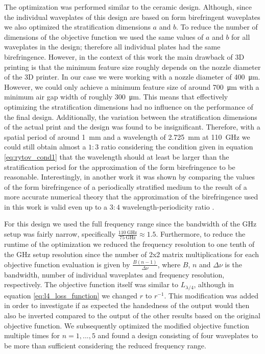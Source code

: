 The optimization was performed similar to the ceramic design. Although, since the individual waveplates of this design are based on form birefringent waveplates we also optimized the stratification dimensions $a$ and $b$. To reduce the number of dimensions of the objective function we used the same values of $a$ and $b$ for all waveplates in the design; therefore all individual plates had the same birefringence. However, in the context of this work the main drawback of 3D printing is that the minimum feature size roughly depends on the nozzle diameter of the 3D printer. In our case we were working with a nozzle diameter of \SI{400}{\micro \meter}. However, we could only achieve a minimum feature size of around \SI{700}{\micro \meter} with a minimum air gap width of roughly \SI{300}{\micro \meter}. This means that effectively optimizing the stratification dimensions had no influence on the performance of the final design. Additionally, the variation between the stratification dimensions of the actual print and the design was found to be insignificant. 
Therefore, with a spatial period of around \SI{1}{\milli \meter} and a wavelength of \SI{2.725}{\milli \meter} at \SI{110}{\giga \hertz} we could still obtain almost a $1:3$ ratio considering the condition given in equation \ref{eq:rytov_cond1} that the wavelength should at least be larger than the stratification period for the approximation of the form birefringence to be reasonable. Interestingly, in another work it was shown by comparing the values of the form birefringence of a periodically stratified medium to the result of a more accurate numerical theory that the approximation of the birefringence used in this work is valid even up to a $3:4$ wavelength-periodicity ratio \cite{Busch2016}.

For this design we used the full frequency range since the bandwidth of the GHz setup was fairly narrow, specifically $\frac{\SI{110}{\giga \hertz}}{\SI{75}{\giga \hertz}} \approx 1.5$. Furthermore, to reduce the runtime of the optimization we reduced the frequency resolution to one tenth of the GHz setup resolution since the number of 2x2 matrix multiplications for each objective function evaluation is given by $\frac{B(n-1)}{\Delta \nu}$, where $B$, $n$ and $\Delta \nu$ is the bandwidth, number of individual waveplates and frequency resolution, respectively. The objective function itself was similar to $L_{\lambda/4}$, although in equation \ref{eq:l4_loss_function} we changed $r$ to $r^{-1}$. This modification was added in order to investigate if as expected the handedness of the output would then also be inverted compared to the output of the other results based on the original objective function. We subsequently optimized the modified objective function multiple times for $n=1, ..., 5$ and found a design consisting of four waveplates to be more than sufficient considering the reduced frequency range. 

